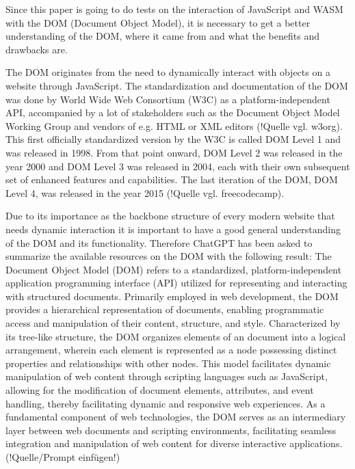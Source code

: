 Since this paper is going to do tests on the interaction of JavaScript and WASM with the DOM (Document Object Model), it is necessary to get a better understanding of the DOM, where it came from and what the benefits and drawbacks are.

The DOM originates from the need to dynamically interact with objects on a website through JavaScript. The standardization and documentation of the DOM was done by World Wide Web Consortium (W3C) as a platform-independent API, accompanied by a lot of stakeholders such as the Document Object Model Working Group and vendors of e.g. HTML or XML editors (!Quelle vgl. w3org). This first officially standardized version by the W3C is called DOM Level 1 and was released in 1998. From that point onward, DOM Level 2 was released in the year 2000 and DOM Level 3 was released in 2004, each with their own subsequent set of enhanced features and capabilities. The last iteration of the DOM, DOM Level 4, was released in the year 2015 (!Quelle vgl. freecodecamp).

Due to its importance as the backbone structure of every modern website that needs dynamic interaction it is important to have a good general understanding of the DOM and its functionality. Therefore ChatGPT has been asked to summarize the available resources on the DOM with the following result:
The Document Object Model (DOM) refers to a standardized, platform-independent application programming interface (API) utilized for representing and interacting with structured documents. Primarily employed in web development, the  DOM provides a hierarchical representation of documents, enabling programmatic access and manipulation of their content, structure, and style. Characterized by its tree-like structure, the DOM organizes elements of an  document into a logical arrangement, wherein each element is represented as a node possessing distinct properties and relationships with other nodes. This model facilitates dynamic manipulation of web content through scripting languages such as JavaScript, allowing for the modification of document elements, attributes, and event handling, thereby facilitating dynamic and responsive web experiences. As a fundamental component of web technologies, the  DOM serves as an intermediary layer between web documents and scripting environments, facilitating seamless integration and manipulation of web content for diverse interactive applications. (!Quelle/Prompt einfügen!)

